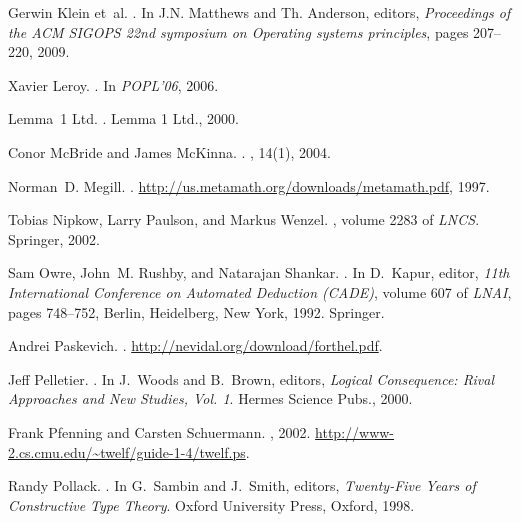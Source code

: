 \documentclass{LMCS}
\begin{document}
\begin{thebibliography}{10}
Gerwin Klein et~al.
.
\newblock In J.N. Matthews and Th. Anderson, editors, {\em {Proceedings of the
  ACM SIGOPS 22nd symposium on Operating systems principles}}, pages 207--220,
  2009.

Xavier Leroy.
.
\newblock In {\em {POPL'06}}, 2006.

Lemma~1 Ltd.
.
\newblock Lemma 1 Ltd., 2000.

Conor McBride and James McKinna.
.
, 14(1), 2004.

Norman~D. Megill.
.
\newblock \url{http://us.metamath.org/downloads/metamath.pdf}, 1997.

Tobias Nipkow, Larry Paulson, and Markus Wenzel.
,
  volume 2283 of {\em LNCS}.
\newblock Springer, 2002.

Sam Owre, John~M. Rushby, and Natarajan Shankar.
.
\newblock In D.~Kapur, editor, {\em 11th International Conference on Automated
  Deduction (CADE)}, volume 607 of {\em LNAI}, pages 748--752, Berlin,
  Heidelberg, New York, 1992. Springer.

Andrei Paskevich.
.
\newblock \url{http://nevidal.org/download/forthel.pdf}.

Jeff Pelletier.
.
\newblock In J.~Woods and B.~Brown, editors, {\em Logical Consequence: Rival
  Approaches and New Studies, Vol. 1}. Hermes Science Pubs., 2000.

Frank Pfenning and Carsten Schuermann.
, 2002.
\newblock \url{http://www-2.cs.cmu.edu/~twelf/guide-1-4/twelf.ps}.

Randy Pollack.
.
\newblock In G.~Sambin and J.~Smith, editors, {\em Twenty-Five Years of
  Constructive Type Theory}. Oxford University Press, Oxford, 1998.


\end{thebibliography}
\end{document}
